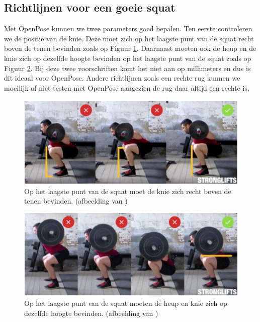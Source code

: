 \documentclass[a4paper,twoside,kulak]{kulakreport}
\begin{document}
\subsection{Richtlijnen voor een goeie squat}

Met OpenPose kunnen we twee parameters goed bepalen.
Ten eerste controleren we de positie van de knie. Deze moet zich op het laagste punt van de squat recht boven de tenen bevinden zoals op Figuur \ref{squat_knie}. Daarnaast moeten ook de heup en de knie zich op dezelfde hoogte bevinden op het laagste punt van de squat zoals op Figuur \ref{squat_heup}. Bij deze twee voorschriften komt het niet aan op millimeters en dus is dit ideaal voor OpenPose. Andere richtlijnen zoals een rechte rug kunnen we moeilijk of niet testen met OpenPose aangezien de rug daar altijd een rechte is.

\begin{figure}[H]
	\includegraphics[width= \textwidth]{squat_knie}
	\caption{Op het laagste punt van de squat moet de knie zich recht boven de tenen bevinden. (afbeelding van \cite{squats})}
	\label{squat_knie}
\end{figure}

\begin{figure}[H]
	\includegraphics[width= \textwidth]{squat_heup}
	\caption{Op het laagste punt van de squat moeten de heup en knie zich op dezelfde hoogte bevinden. (afbeelding van \cite{squats})}
	\label{squat_heup}
\end{figure}
\end{document}
